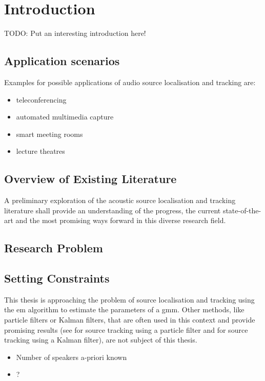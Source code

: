 \chapter{Introduction}
TODO: Put an interesting introduction here!
\section{Application scenarios}
Examples for possible applications of audio source localisation and tracking are:
\begin{itemize}
\setlength\itemsep{0cm}
	\item teleconferencing
	\item automated multimedia capture
	\item smart meeting rooms
	\item lecture theatres \cite{Lehmann2007}
\end{itemize}

\section{Overview of Existing Literature}
A preliminary exploration of the acoustic source localisation and tracking literature shall provide an understanding of the progress, the current state-of-the-art and the most promising ways forward in this diverse research field. 


\section{Research Problem}
\section{Setting Constraints}
This thesis is approaching the problem of source localisation and tracking using the \gls{em} algorithm to estimate the parameters of a \gls{gmm}. Other methods, like particle filters or Kalman filters, that are often used in this context and provide promising results (see \cite{Lehmann2007} for source tracking using a particle filter and \cite{Gannot2012} for source tracking using a Kalman filter), are not subject of this thesis.
\begin{itemize}
	\item Number of speakers a-priori known
	\item ?
\end{itemize}
